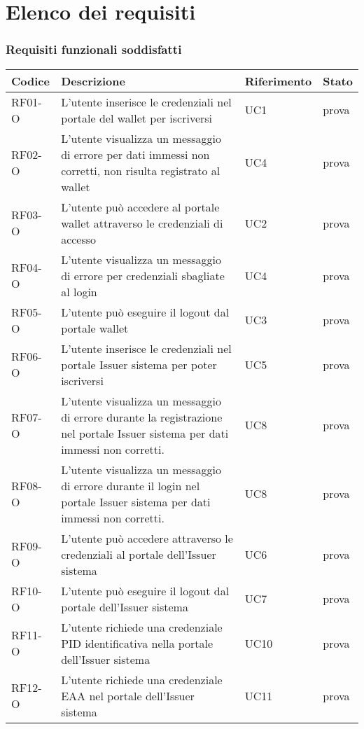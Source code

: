 \section{Elenco dei requisiti}
\subsubsection*{Requisiti funzionali soddisfatti} %
    \begin{longtable}{|p{}|p{}|p{}|p{}|}
        \hline
        \textbf{Codice} & \textbf{Descrizione} & \textbf{Riferimento} & \textbf{Stato}\\
        \hline
        RF01-O & L'utente inserisce le credenziali nel portale del wallet per iscriversi & UC1 & prova\\
        RF02-O & L'utente visualizza un messaggio di errore per dati immessi non corretti, non risulta registrato al wallet & UC4& prova\\
        RF03-O & L'utente può accedere al portale wallet attraverso le credenziali di accesso & UC2& prova\\
        RF04-O & L'utente visualizza un messaggio di errore per credenziali sbagliate al login & UC4& prova\\ 
        RF05-O & L'utente può eseguire il logout dal portale wallet & UC3& prova\\
        RF06-O & L'utente inserisce le credenziali nel portale Issuer sistema per poter iscriversi & UC5& prova\\
        RF07-O & L'utente visualizza un messaggio di errore durante la registrazione nel portale Issuer sistema per dati immessi non corretti. & UC8& prova\\
        RF08-O & L'utente visualizza un messaggio di errore durante il login nel portale Issuer sistema per dati immessi non corretti. & UC8& prova\\
        RF09-O & L'utente può accedere attraverso le credenziali al portale dell'Issuer sistema & UC6& prova\\
        RF10-O & L'utente può eseguire il logout dal portale dell'Issuer sistema & UC7& prova\\
        RF11-O & L'utente richiede una credenziale PID identificativa nella portale dell'Issuer sistema & UC10& prova\\
        RF12-O & L'utente richiede una credenziale EAA nel portale dell'Issuer sistema & UC11& prova\\

\end{longtable}

